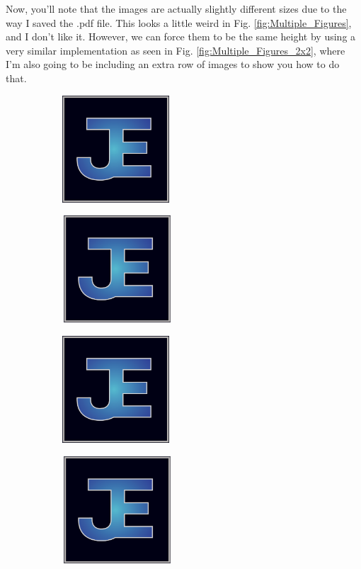 \documentclass[letterpaper,12pt]{article}
\begin{document}
Now, you'll note that the images are actually slightly different sizes due to the way I saved the .pdf file.  This looks a little weird in Fig. \ref{fig:Multiple_Figures}, and I don't like it.  However, we can force them to be the same height by using a very similar implementation as seen in Fig. \ref{fig:Multiple_Figures_2x2}, where I'm also going to be including an extra row of images to show you how to do that.

\begin{figure}[h]
    \centering
    \begin{subfigure}[b]{0.45\textwidth}
        \includegraphics[height=4cm]{JTE_Logo_PNG.PNG}
        \caption{}
        \label{fig:JTE_Logo_PNG_a}
    \end{subfigure}
    \begin{subfigure}[b]{0.45\textwidth}
        \includegraphics[height=4cm]{JTE_Logo_PDF.PDF}
        \caption{}
        \label{fig:JTE_Logo_PDF_b}
    \end{subfigure}
    
    \begin{subfigure}[b]{0.45\textwidth}
    	\centering
        \includegraphics[height=4cm]{JTE_Logo_PNG.PNG}
        \caption{}
        \label{fig:JTE_Logo_PNG_c}
    \end{subfigure}
    \begin{subfigure}[b]{0.45\textwidth}
    	\centering
        \includegraphics[height=4cm]{JTE_Logo_PDF.PDF}
        \caption{}
        \label{fig:JTE_Logo_PDF_d}
    \end{subfigure}
 	

\end{figure}
\end{document}
